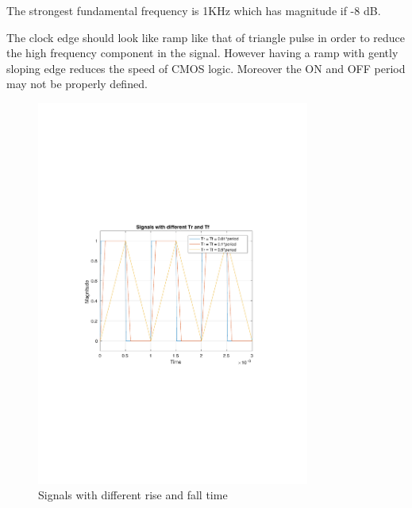 \documentclass[12pt,a4paper,UKenglish]{article}
\begin{document}
The strongest fundamental frequency is 1KHz which has magnitude if -8 dB.

The clock edge should look like ramp like that of triangle pulse in order to reduce the high frequency component in the signal. However having a ramp with gently sloping edge reduces the speed of CMOS logic. Moreover the ON and OFF period may not be properly defined. 

\begin{figure} [H]
  \centering 
  \includegraphics[width=0.8\textwidth]{img/2b_tran.pdf} 
  \caption{Signals with different rise and fall time}
  \label{tran_all} 
\end{figure}
\end{document}
